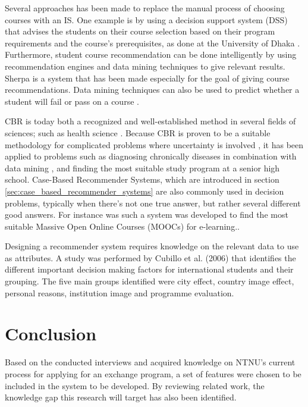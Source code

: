 Several approaches has been made to replace the manual process of choosing courses with an IS. One example is by using a decision support system (DSS) that advises the students on their course selection based on their program requirements and the course's prerequisites, as done at the University of Dhaka \cite{roushan2014university}. Furthermore, student course recommendation can be done intelligently by using recommendation engines and data mining techniques to give relevant results. Sherpa \cite{bramucci2012sherpa} is a system that has been made especially for the goal of giving course recommendations. Data mining techniques can also be used to predict whether a student will fail or pass on a course \cite{vialardi2009recommendation}.

CBR is today both a recognized and well-established method in several fields of sciences; such as health science \cite{begum2011case}. Because CBR is proven to be a suitable methodology for complicated problems where uncertainty is involved \cite{richter2013case}, it has been applied to problems such as diagnosing chronically diseases in combination with data mining \cite{huang2007integrating}, and finding the most suitable study program at a senior high school\cite{mulyana2015case}. Case-Based Recommender Systems, which are introduced in section \ref{sec:case_based_recommender_systems} are also commonly used in decision problems, typically when there's not one true answer, but rather several different good answers. For instance was such a system was developed to find the most suitable Massive Open Online Courses (MOOCs) for e-learning.\cite{bousbahi2015mooc}. 

Designing a recommender system requires knowledge on the relevant data to use as attributes. A study was performed by Cubillo et al. (2006)\cite{maria2006international} that identifies the different important decision making factors for international students and their grouping. The five main groups identified were city effect, country image effect, personal reasons, institution image and programme evaluation.    


\section{Conclusion}
Based on the conducted interviews and acquired knowledge on NTNU's current process for applying for an exchange program, a set of features were chosen to be included in the system to be developed. By reviewing related work, the knowledge gap this research will target has also been identified.

